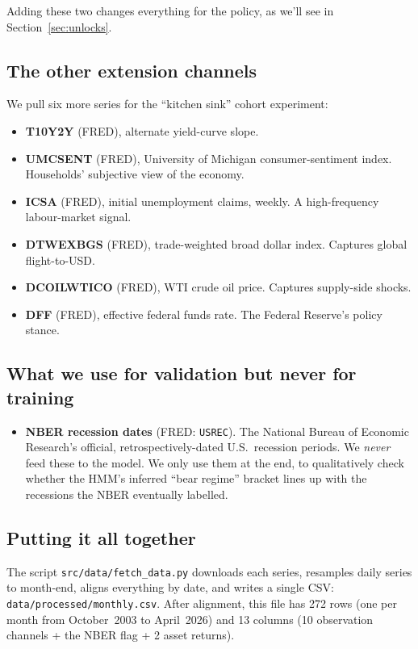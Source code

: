 \documentclass[11pt]{article}
\begin{document}
Adding these two changes everything for the policy, as we'll see in Section~\ref{sec:unlocks}.

\subsection{The other extension channels}

We pull six more series for the ``kitchen sink'' cohort experiment:

\begin{itemize}
  \item \textbf{T10Y2Y} (FRED), alternate yield-curve slope.
  \item \textbf{UMCSENT} (FRED), University of Michigan consumer-sentiment index. Households' subjective view of the economy.
  \item \textbf{ICSA} (FRED), initial unemployment claims, weekly. A high-frequency labour-market signal.
  \item \textbf{DTWEXBGS} (FRED), trade-weighted broad dollar index. Captures global flight-to-USD.
  \item \textbf{DCOILWTICO} (FRED), WTI crude oil price. Captures supply-side shocks.
  \item \textbf{DFF} (FRED), effective federal funds rate. The Federal Reserve's policy stance.
\end{itemize}

\subsection{What we use for validation but never for training}

\begin{itemize}
  \item \textbf{NBER recession dates} (FRED: \texttt{USREC}). The National Bureau of Economic Research's official, retrospectively-dated U.S.\ recession periods. We \emph{never} feed these to the model. We only use them at the end, to qualitatively check whether the HMM's inferred ``bear regime'' bracket lines up with the recessions the NBER eventually labelled.
\end{itemize}

\subsection{Putting it all together}

The script \texttt{src/data/fetch\_data.py} downloads each series, resamples daily series to month-end, aligns everything by date, and writes a single CSV: \texttt{data/processed/monthly.csv}. After alignment, this file has 272 rows (one per month from October~2003 to April~2026) and 13 columns (10 observation channels + the NBER flag + 2 asset returns).
\end{document}
